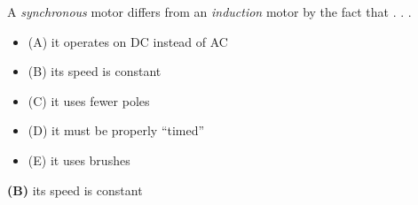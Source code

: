 

A {\it synchronous} motor differs from an {\it induction} motor by the fact that . . .

\begin{itemize}
\item{(A)} it operates on DC instead of AC
\vskip 5pt 
\item{(B)} its speed is constant
\vskip 5pt 
\item{(C)} it uses fewer poles
\vskip 5pt 
\item{(D)} it must be properly ``timed'' 
\vskip 5pt 
\item{(E)} it uses brushes
\end{itemize}







{\bf (B)} its speed is constant











